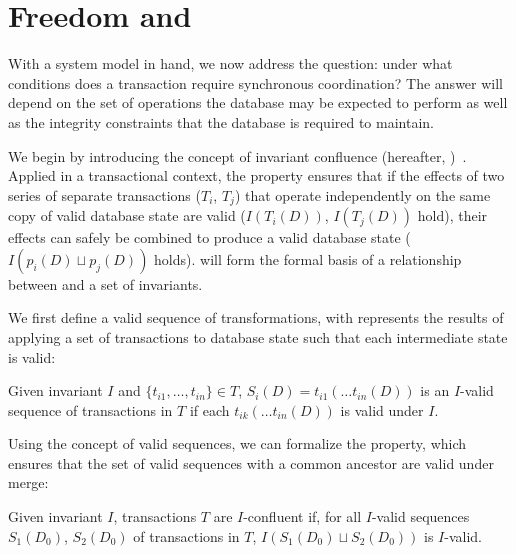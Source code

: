 
\section{Freedom and \iconfluence}
\label{sec:bcc-theory}

With a system model in hand, we now address the question: under what
conditions does a transaction require synchronous coordination? The
answer will depend on the set of operations the database may be
expected to perform as well as the integrity constraints that the
database is required to maintain.

We begin by introducing the concept of invariant confluence
(hereafter, \iconfluence)~\cite{obs-confluence}. Applied in a
transactional context, the \iconfluence property ensures that if the
effects of two series of separate transactions ($T_i$, $T_j$) that
operate independently on the same copy of valid database state are
valid ($I(T_i(D))$, $I(T_j(D))$ hold), their effects can safely be
combined to produce a valid database state ($I(p_i(D) \sqcup p_j(D))$
holds). \iconfluence will form the formal basis of a relationship
between \cfreedom and a set of invariants.

We first define a valid sequence of transformations, with represents
the results of applying a set of transactions to database state such
that each intermediate state is valid:

\begin{definition}
Given invariant $I$ and $\{t_{i1}, \dots, t_{in}\} \in T$, $S_i(D) =
t_{i1}(\dots t_{in}(D))$ is an $I$-valid sequence of transactions in
$T$ if each $t_{ik}(\dots t_{in}(D))$ is valid under $I$.
\end{definition}

Using the concept of valid sequences, we can formalize the
\iconfluence property, which ensures that the set of valid sequences
with a common ancestor are valid under merge:

\begin{definition}[\iconfluence]
Given invariant $I$, transactions $T$ are $I$-confluent if, for all
$I$-valid sequences $S_1(D_0)$, $S_2(D_0)$ of transactions in $T$,
$I(S_1(D_0) \sqcup S_2(D_0))$ is $I$-valid.
\end{definition}


